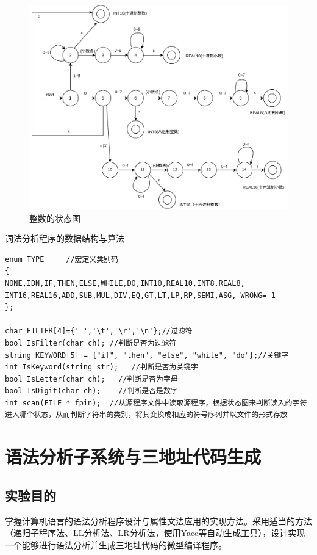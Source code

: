 \documentclass{ctexrep}
\begin{document}
\begin{outline}
\begin{figure}[htp]
    \centering
    \includegraphics[width=0.8\linewidth]{2.5.drawio.pdf}
    \caption{整数的状态图}
\end{figure}
    \1 词法分析程序的数据结构与算法
\begin{verbatim}
enum TYPE     //宏定义类别码
{
NONE,IDN,IF,THEN,ELSE,WHILE,DO,INT10,REAL10,INT8,REAL8,
INT16,REAL16,ADD,SUB,MUL,DIV,EQ,GT,LT,LP,RP,SEMI,ASG, WRONG=-1
};

char FILTER[4]={' ','\t','\r','\n'};//过滤符
bool IsFilter(char ch); //判断是否为过滤符
string KEYWORD[5] = {"if", "then", "else", "while", "do"};//关键字
int IsKeyword(string str);   //判断是否为关键字
bool IsLetter(char ch);   //判断是否为字母
bool IsDigit(char ch);    //判断是否是数字
int scan(FILE * fpin);  //从源程序文件中读取源程序，根据状态图来判断读入的字符进入哪个状态，从而判断字符串的类别，将其变换成相应的符号序列并以文件的形式存放

\end{verbatim}
        
\end{outline}



\section{语法分析子系统与三地址代码生成}
\subsection{实验目的}
掌握计算机语言的语法分析程序设计与属性文法应用的实现方法。采用适当的方法（递归子程序法、LL分析法、LR分析法，使用Yacc等自动生成工具），设计实现一个能够进行语法分析并生成三地址代码的微型编译程序。
\end{document}
